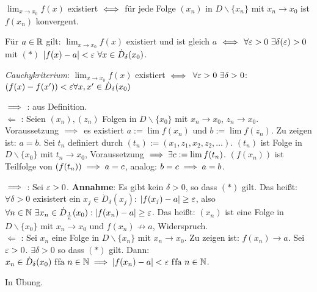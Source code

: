 \documentclass[a4paper,twoside,DIV15,BCOR12mm]{scrbook}
\begin{document}
\begin{satz}
\begin{liste}
\item $\displaystyle\lim_{x\to x_0}f(x)$ existiert $\iff$ für jede Folge $(x_n)$ in $D\backslash\{x_n\}$ mit $x_n \to x_0$ ist $f(x_n)$ konvergent.
\item Für $a\in\mathbb{R}$ gilt: $\displaystyle\lim_{x\to x_0}f(x)$ existiert und ist gleich $a$ $\iff$ $\forall \varepsilon>0 \ \exists \delta(\varepsilon) > 0$ mit $(*)$ $|f(x) - a|< \varepsilon \ \forall x \in \dot D_\delta(x_0)$. 
\item \textit{Cauchykriterium}: $\displaystyle\lim_{x\to x_0} f(x)$ existiert $\iff$ $\forall \varepsilon>0 \ \exists \delta >0$: $(f(x) - f(x'))<\varepsilon \forall x,x' \in \dot D_\delta(x_0)$
\end{liste}
\end{satz}

\begin{beweise}
\item \glqq $\implies$ \grqq: aus Definition. \\
\glqq $\Leftarrow$ \grqq: Seien $(x_n), (z_n)$ Folgen in $D\backslash\{x_0\}$ mit $x_n \to x_0$, $z_n \to x_0$. Voraussetzung $\implies$ es existiert $a := \lim f(x_n)$ und $b := \lim f(z_n)$. Zu zeigen ist: $a=b$. Sei $t_n$ definiert durch $(t_n) := (x_1,z_1,x_2,z_2,\ldots)$. $(t_n)$ ist Folge in $D \backslash\{x_0\}$ mit $t_n\to x_0$, Voraussetzung $\implies  \exists c := \lim f(t_n)$. $(f(x_n))$ ist Teilfolge von $(f(t_n)) \implies a=c$, analog: $b=c \implies a = b$.
\item \glqq $\implies$ \grqq: Sei $\varepsilon > 0$. \textbf{Annahme}: Es gibt kein $\delta > 0$, so dass $(*)$ gilt. Das heißt: $\forall \delta > 0$ exisistert ein $x_j \in \dot D_\delta(x_j)$: $|f(x_j) - a| \ge \varepsilon$, also $\forall n\in\mathbb{N} \ \exists x_n \in \dot D_{\frac{1}{n}}(x_0): |f(x_n) - a|\ge\varepsilon$. Das heißt: $(x_n)$ ist eine Folge in $D \backslash\{x_0\}$ mit $x_n \to x_0$ und $f(x_n) \nrightarrow a$, Widerspruch. \\
\glqq $\Leftarrow$ \grqq: Sei $x_n$ eine Folge in $D \backslash\{x_n\}$ mit $x_n \to x_0$. Zu zeigen ist: $f(x_n) \to a$. Sei $\varepsilon>0$. $\exists \delta > 0$ so dass $(*)$ gilt. Dann: $x_n \in \dot D_\delta(x_0) \text{ f\/fa } n\in\mathbb{N} \implies |f(x_n) - a| < \varepsilon \text{ f\/fa } n\in\mathbb{N}$.
\item In Übung.
\end{beweise}
\end{document}
